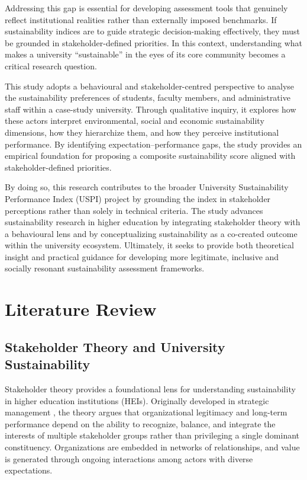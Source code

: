\documentclass[12pt,a4paper]{article}
\begin{document}
Addressing this gap is essential for developing assessment tools that genuinely reflect institutional realities rather than externally imposed benchmarks. If sustainability indices are to guide strategic decision-making effectively, they must be grounded in stakeholder-defined priorities. In this context, understanding what makes a university ``sustainable'' in the eyes of its core community becomes a critical research question.

This study adopts a behavioural and stakeholder-centred perspective to analyse the sustainability preferences of students, faculty members, and administrative staff within a case-study university. Through qualitative inquiry, it explores how these actors interpret environmental, social and economic sustainability dimensions, how they hierarchize them, and how they perceive institutional performance. By identifying expectation--performance gaps, the study provides an empirical foundation for proposing a composite sustainability score aligned with stakeholder-defined priorities.

By doing so, this research contributes to the broader University Sustainability Performance Index (USPI) project by grounding the index in stakeholder perceptions rather than solely in technical criteria. The study advances sustainability research in higher education by integrating stakeholder theory with a behavioural lens and by conceptualizing sustainability as a co-created outcome within the university ecosystem. Ultimately, it seeks to provide both theoretical insight and practical guidance for developing more legitimate, inclusive and socially resonant sustainability assessment frameworks.

\section{Literature Review}

\subsection{Stakeholder Theory and University Sustainability}

Stakeholder theory provides a foundational lens for understanding sustainability in higher education institutions (HEIs). Originally developed in strategic management \citep{Freeman1984}, the theory argues that organizational legitimacy and long-term performance depend on the ability to recognize, balance, and integrate the interests of multiple stakeholder groups rather than privileging a single dominant constituency. Organizations are embedded in networks of relationships, and value is generated through ongoing interactions among actors with diverse expectations.
\end{document}
